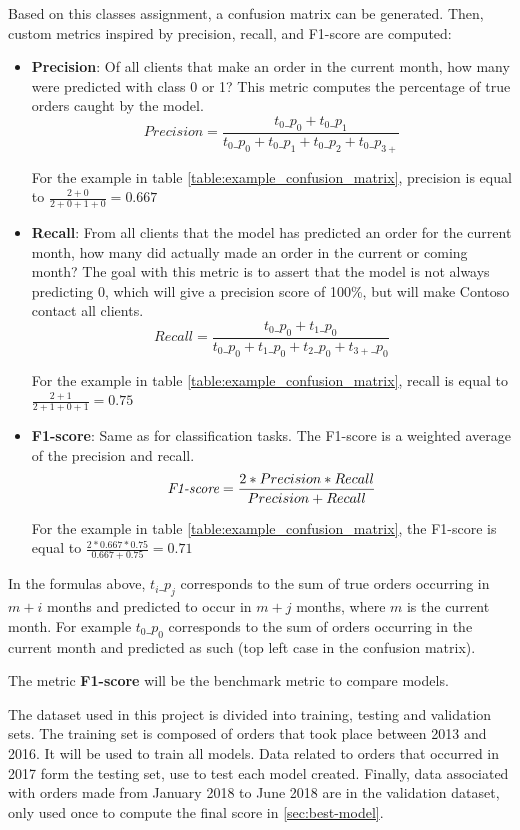 Based on this classes assignment, a confusion matrix can be generated. Then, custom metrics inspired by precision, recall, and F1-score are computed:
\begin{itemize}
    \item \textbf{Precision}: Of all clients that make an order in the current month, how many were predicted with class 0 or 1? This metric computes the percentage of true orders caught by the model. 
    $$ Precision = \frac{t_0\_p_0 + t_0\_p_1}{t_0\_p_0 + t_0\_p_1 + t_0\_p_2 + t_0\_p_{3+}} $$
    
    For the example in table \ref{table:example_confusion_matrix}, precision is equal to $\frac{2+0}{2+0+1+0} = 0.667$
    
    \item \textbf{Recall}: From all clients that the model has predicted an order for the current month, how many did actually made an order in the current or coming month? The goal with this metric is to assert that the model is not always predicting 0, which will give a precision score of 100\%, but will make Contoso contact all clients. 
    $$ Recall = \frac{t_0\_p_0 + t_1\_p_0}{t_0\_p_0 + t_1\_p_0 + t_2\_p_0 + t_{3+}\_p_0} $$
    
    For the example in table \ref{table:example_confusion_matrix}, recall is equal to $\frac{2+1}{2+1+0+1} = 0.75$
    
    \item \textbf{F1-score}: Same as for classification tasks. The F1-score is a weighted average of the precision and recall.
    $$ \operatorname{\textit{F1-score}} = \frac{2*Precision*Recall}{Precision+Recall} $$

    For the example in table \ref{table:example_confusion_matrix}, the F1-score is equal to $\frac{2*0.667*0.75}{0.667+0.75} = 0.71$
\end{itemize}

In the formulas above, $t_i\_p_j$ corresponds to the sum of true orders occurring in $m+i$ months and predicted to occur in $m+j$ months, where $m$ is the current month. For example $t_0\_p_0$ corresponds to the sum of orders occurring in the current month and predicted as such (top left case in the confusion matrix).

The metric \textbf{F1-score} will be the benchmark metric to compare models.

The dataset used in this project is divided into training, testing and validation sets. The training set is composed of orders that took place between 2013 and 2016. It will be used to train all models. Data related to orders that occurred in 2017 form the testing set, use to test each model created. Finally, data associated with orders made from January 2018 to June 2018 are in the validation dataset, only used once to compute the final score in \ref{sec:best-model}.

